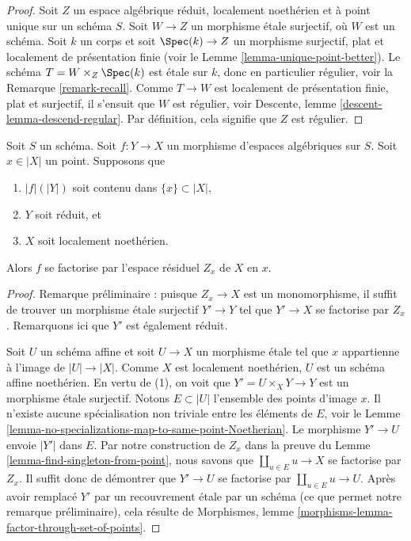 \begin{proof}
Soit $Z$ un espace algébrique réduit, localement noethérien et à point unique
sur un schéma $S$. Soit $W \to Z$ un morphisme \'etale surjectif, où $W$
est un schéma. Soit $k$ un corps et soit $\Spec(k) \to Z$
un morphisme surjectif, plat et localement de présentation finie (voir le
Lemme \ref{lemma-unique-point-better}).
Le schéma $T = W \times_Z \Spec(k)$ est
\'etale sur $k$, donc en particulier régulier, voir la
Remarque \ref{remark-recall}.
Comme $T \to W$ est localement de présentation finie, plat et surjectif,
il s'ensuit que $W$ est régulier, voir
Descente, lemme \ref{descent-lemma-descend-regular}.
Par définition, cela signifie que $Z$ est régulier.
\end{proof}

\begin{lemma}
\label{lemma-factor-through-residual-space-Noetherian}
Soit $S$ un schéma. Soit $f : Y \to X$ un morphisme d'espaces
algébriques sur $S$. Soit $x \in |X|$ un point. Supposons que
\begin{enumerate}
\item $|f|(|Y|)$ soit contenu dans $\{x\} \subset |X|$,
\item $Y$ soit réduit, et
\item $X$ soit localement noethérien.
\end{enumerate}
Alors $f$ se factorise par l'espace résiduel $Z_x$ de $X$ en $x$.
\end{lemma}

\begin{proof}
Remarque préliminaire : puisque $Z_x \to X$ est un monomorphisme, il suffit
de trouver un morphisme \'etale surjectif $Y' \to Y$ tel que $Y' \to X$
se factorise par $Z_x$. Remarquons ici que $Y'$ est également réduit.

\medskip\noindent
Soit $U$ un schéma affine et soit $U \to X$ un morphisme \'etale
tel que $x$ appartienne à l'image de $|U| \to |X|$. Comme $X$ est localement
noethérien, $U$ est un schéma affine noethérien. En vertu de (1),
on voit que $Y' = U \times_X Y \to Y$ est un morphisme \'etale surjectif.
Notons $E \subset |U|$ l'ensemble des points d'image $x$.
Il n'existe aucune spécialisation non triviale entre les éléments de $E$, voir
le Lemme \ref{lemma-no-specializations-map-to-same-point-Noetherian}.
Le morphisme $Y' \to U$ envoie $|Y'|$ dans $E$. Par notre construction
de $Z_x$ dans la preuve du Lemme \ref{lemma-find-singleton-from-point},
nous savons que $\coprod_{u \in E} u \to X$ se factorise par $Z_x$.
Il suffit donc de démontrer que $Y' \to U$ se factorise par
$\coprod_{u \in E} u \to U$. Après avoir remplacé $Y'$ par un recouvrement
\'etale par un schéma (ce que permet notre remarque préliminaire), cela résulte
de Morphismes, lemme \ref{morphisms-lemma-factor-through-set-of-points}.
\end{proof}

